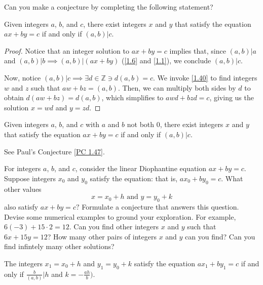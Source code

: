 \documentclass[../main.tex]{subfiles}
\begin{document}
\begin{ques} \label{1.47}
  Can you make a conjecture by completing the following statement?
\end{ques}

\begin{PC} \label{PC 1.47}
  Given integers $a$, $b$, and $c$, there exist integers $x$ and $y$ that satisfy the equation $ax + by = c$ if and only if $(a, b) | c$.
\end{PC}

\begin{proof}
  Notice that an integer solution to $ax + by = c$ implies that, since $(a, b) | a$ and $(a, b) | b \implies (a, b) | (ax + by)$ (\ref{1.6} and \ref{1.1}), we conclude $(a, b) | c$.

  Now, notice $(a, b) | c \implies \exists d \in \mathbb{Z} \ni d(a, b) = c$. We invoke \ref{1.40} to find integers $w$ and $z$ such that $aw + bz = (a, b)$. Then, we can multiply both sides by $d$ to obtain $d (aw + bz) = d (a,b)$, which simplifies to $awd + bzd = c$, giving us the solution $x = wd$ and $y = zd$.
\end{proof}



\begin{thm} \label{1.48}
  Given integers $a$, $b$, and $c$ with $a$ and $b$ not both $0$, there exist integers $x$ and $y$ that satisfy the equation $ax + by = c$ if and only if $(a, b) | c$.
\end{thm}

See Paul's Conjecture \ref{PC 1.47}.



\pagebreak



\begin{ques} \label{1.49}
  For integers $a$, $b$, and $c$, consider the linear Diophantine equation $ax + by = c$. Suppose integers $x_0$ and $y_0$ satisfy the equation: that is, $ax_0 + by_0 = c$. What other values
  $$x = x_0 + h \mbox{ and } y = y_0 + k$$
  also satisfy $ax + by = c?$ Formulate a conjecture that answers this question. Devise some numerical examples to ground your exploration. For example, $6(-3) + 15 \cdot 2 = 12$. Can you find other integers $x$ and $y$ such that $6x + 15y = 12$? How many other pairs of integers $x$ and $y$ can you find? Can you find infintely many other solutions?
\end{ques}

\begin{PC} \label{PC 1.49}
  The integers $x_1 = x_0 + h$ and $y_1 = y_0 + k$ satisfy the equation $ax_1 + by_1 = c$ if and only if $\frac{b}{(a, b)} | h$ and $k = - \frac{ah}{b})$.
\end{PC}
\end{document}
